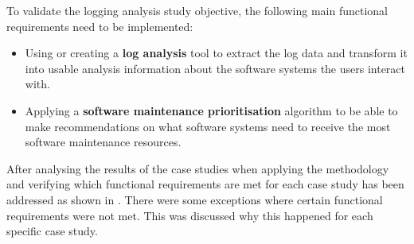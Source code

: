 \begin{enumerate}[label=\textbf{\Roman*.}]
	 To validate the logging analysis study objective, the following main functional requirements
	 need to be implemented:
	 \begin{itemize}
		\item Using or creating a \textbf{log analysis} tool to extract the log data and transform
		it into usable analysis information about the software systems the users interact with.
		\item Applying a \textbf{software maintenance prioritisation} algorithm to be able to make
		recommendations on what software systems need to receive the most software maintenance
		resources.
	 \end{itemize}

	 After analysing the results of the case studies when applying the methodology and verifying
	 which functional requirements are met for each case study has been addressed as shown in
	 . There were some exceptions where certain functional
	 requirements were not met. This was discussed why this happened for each specific case study.
\end{enumerate}


